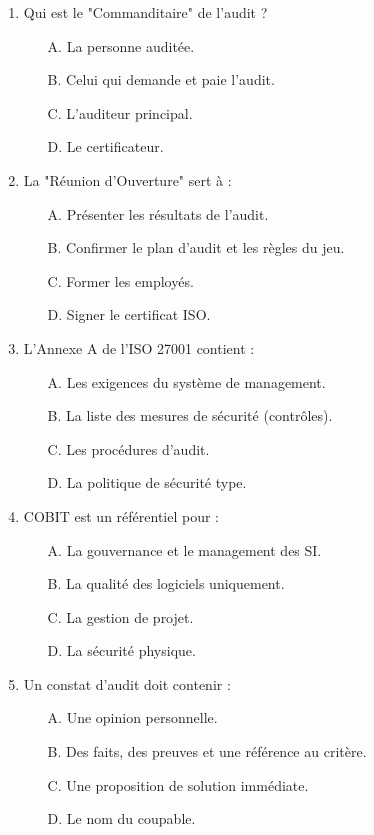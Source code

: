 \begin{enumerate}
    \item Qui est le "Commanditaire" de l'audit ?
    \begin{itemize}
        \item[A.] La personne auditée.
        \item[B.] Celui qui demande et paie l'audit.
        \item[C.] L'auditeur principal.
        \item[D.] Le certificateur.
    \end{itemize}

    \item La "Réunion d'Ouverture" sert à :
    \begin{itemize}
        \item[A.] Présenter les résultats de l'audit.
        \item[B.] Confirmer le plan d'audit et les règles du jeu.
        \item[C.] Former les employés.
        \item[D.] Signer le certificat ISO.
    \end{itemize}

    \item L'Annexe A de l'ISO 27001 contient :
    \begin{itemize}
        \item[A.] Les exigences du système de management.
        \item[B.] La liste des mesures de sécurité (contrôles).
        \item[C.] Les procédures d'audit.
        \item[D.] La politique de sécurité type.
    \end{itemize}

    \item COBIT est un référentiel pour :
    \begin{itemize}
        \item[A.] La gouvernance et le management des SI.
        \item[B.] La qualité des logiciels uniquement.
        \item[C.] La gestion de projet.
        \item[D.] La sécurité physique.
    \end{itemize}

    \item Un constat d'audit doit contenir :
    \begin{itemize}
        \item[A.] Une opinion personnelle.
        \item[B.] Des faits, des preuves et une référence au critère.
        \item[C.] Une proposition de solution immédiate.
        \item[D.] Le nom du coupable.
    \end{itemize}


\end{enumerate}
